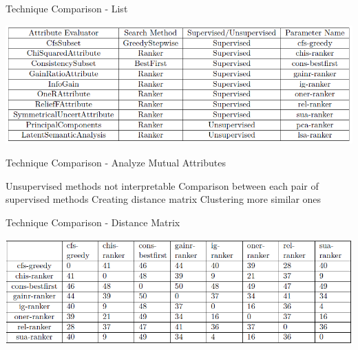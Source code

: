 \begin{frame}{Technique Comparison - List}

\begin{center}
\includegraphics[scale=0.5]{fig/techniques-list.png}
\end{center}

\end{frame}

\begin{frame}{Technique Comparison - Analyze Mutual Attributes}

\bi
  \mi Unsupervised methods not interpretable
  \mi Comparison between each pair of supervised methods
  \mi Creating distance matrix
  \mi Clustering more similar ones
\ei

\end{frame}

\begin{frame}{Technique Comparison - Distance Matrix}

\begin{center}
\includegraphics[scale=0.5]{fig/techniques-dismat.png}
\end{center}

\end{frame}


